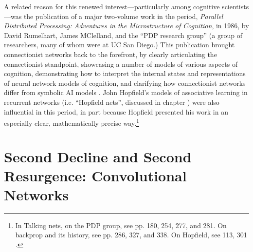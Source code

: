 
A related reason for this renewed interest---particularly among cognitive scientists---was the publication of a major two-volume work in the period, {\em Parallel Distributed Processing: Adventures in the Microstructure of Cognition}, in 1986, by David Rumelhart, James MClelland, and the ``PDP research group'' (a group of researchers, many of whom were at UC San Diego.)  This publication brought connectionist networks back to the forefront, by clearly articulating the connectionist standpoint, showcasing a number of models of various aspects of cognition, demonstrating how to interpret the internal states and representations of neural network models of cognition, and clarifying how connectionist networks differ from symbolic AI models \cite{rumelhart1986parallel}. John Hopfield's models of associative learning in recurrent networks (i.e. ``Hopfield nets'', discussed in chapter ) were also influential in this period, in part because Hopfield presented his work in an especially clear, mathematically precise way.\cite{hopfield1982neural}\footnote{In Talking nets, on the PDP group, see pp. 180, 254, 277, and 281. On  backprop and its history, see pp. 286, 327, and 338. On Hopfield, see 113, 301 \cite{anderson2000talking}.}



\section{Second Decline and Second Resurgence: Convolutional Networks}\label{deep_revolution}

